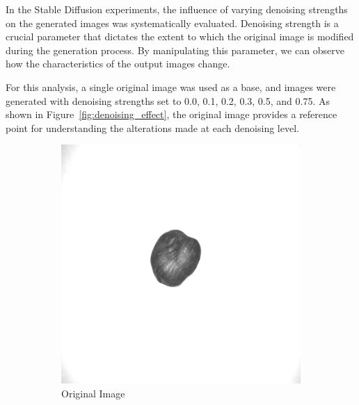 \documentclass[12pt,DIV14,BCOR12mm,a4paper,footinclude=false,headinclude,parskip=half-,twoside,openright,cleardoublepage=empty,toc=index,bibliography=totoc,listof=totoc]{scrreprt}
\numberwithin{equation}{chapter}
\begin{document}
In the Stable Diffusion experiments, the influence of varying denoising strengths on the generated images was systematically evaluated. Denoising strength is a crucial parameter that dictates the extent to which the original image is modified during the generation process. By manipulating this parameter, we can observe how the characteristics of the output images change.

For this analysis, a single original image was used as a base, and images were generated with denoising strengths set to 0.0, 0.1, 0.2, 0.3, 0.5, and 0.75. As shown in Figure~\ref{fig:denoising_effect}, the original image provides a reference point for understanding the alterations made at each denoising level.
\begin{figure}
    \centering
    \begin{subfigure}[t]{0.23\textwidth} %
        \centering
        \includegraphics[width=\linewidth]{../media/image_original.png} %
        \caption{Original Image}
    \end{subfigure}
    \begin{subfigure}[t]{0.23\textwidth} %
        \centering

\end{subfigure}
\end{figure}
\end{document}
